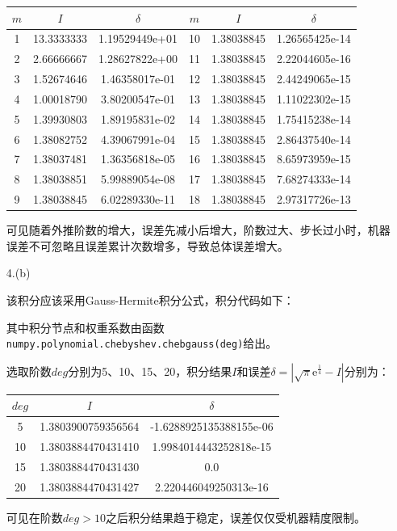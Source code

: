 \documentclass[a4paper]{book}
\begin{document}
\begin{enumerate}
\begin{table}[ht!]
    \begin{center}
    \begin{tabular}{|ccc|ccc|}
        \hline
        $m$ & $I$ & $\delta$ & $m$ & $I$ & $\delta$ \\
        \hline
        1 & 13.3333333 & 1.19529449e+01 & 10 & 1.38038845 & 1.26565425e-14 \\
        2 & 2.66666667 & 1.28627822e+00 & 11 & 1.38038845 & 2.22044605e-16 \\
        3 & 1.52674646 & 1.46358017e-01 & 12 & 1.38038845 & 2.44249065e-15 \\
        4 & 1.00018790 & 3.80200547e-01 & 13 & 1.38038845 & 1.11022302e-15 \\
        5 & 1.39930803 & 1.89195831e-02 & 14 & 1.38038845 & 1.75415238e-14 \\
        6 & 1.38082752 & 4.39067991e-04 & 15 & 1.38038845 & 2.86437540e-14 \\
        7 & 1.38037481 & 1.36356818e-05 & 16 & 1.38038845 & 8.65973959e-15 \\
        8 & 1.38038851 & 5.99889054e-08 & 17 & 1.38038845 & 7.68274333e-14 \\
        9 & 1.38038845 & 6.02289330e-11 & 18 & 1.38038845 & 2.97317726e-13 \\
        \hline
    \end{tabular}
\end{center}
\end{table}

可见随着外推阶数的增大，误差先减小后增大，阶数过大、步长过小时，机器误差不可忽略且误差累计次数增多，导致总体误差增大。

\newpage
\item[4.(b)]

该积分应该采用Gauss-Hermite积分公式，积分代码如下：



其中积分节点和权重系数由函数\texttt{numpy.polynomial.chebyshev.chebgauss(deg)}给出。

选取阶数$deg$分别为5、10、15、20，积分结果$I$和误差$\delta=\left|\sqrt{\pi}\mathrm{e}^{\tfrac{1}{4}}-I\right|$分别为：

\begin{table}[ht!]
    \begin{center}
    \begin{tabular}{|ccc|}
        \hline
        $deg$ & $I$ & $\delta$ \\
        \hline
        5  & 1.3803900759356564 & -1.6288925135388155e-06 \\
        10 & 1.3803884470431410 & 1.9984014443252818e-15  \\
        15 & 1.3803884470431430 & 0.0  \\
        20 & 1.3803884470431427 & 2.220446049250313e-16  \\
        \hline
    \end{tabular}
\end{center}
\end{table}

可见在阶数$deg>10$之后积分结果趋于稳定，误差仅仅受机器精度限制。

\end{enumerate}
\end{document}
